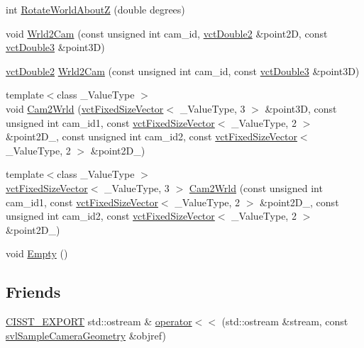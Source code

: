\begin{DoxyCompactItemize}
int \hyperlink{classsvl_sample_camera_geometry_a0d18a9b4f94e5326ba6fcee374e125dd}{Rotate\+World\+About\+Z} (double degrees)
\item 
void \hyperlink{classsvl_sample_camera_geometry_a536c770ee1d9bdc06b5d885d84782307}{Wrld2\+Cam} (const unsigned int cam\+\_\+id, \hyperlink{vct_fixed_size_vector_types_8h_afc0fdcc41cbe8b043747612501610812}{vct\+Double2} \&point2\+D, const \hyperlink{vct_fixed_size_vector_types_8h_a4a89122c9d7f72c3f31fe8126e17c3af}{vct\+Double3} \&point3\+D)
\item 
\hyperlink{vct_fixed_size_vector_types_8h_afc0fdcc41cbe8b043747612501610812}{vct\+Double2} \hyperlink{classsvl_sample_camera_geometry_a90b13ff843d12de76f791033cd51b0a0}{Wrld2\+Cam} (const unsigned int cam\+\_\+id, const \hyperlink{vct_fixed_size_vector_types_8h_a4a89122c9d7f72c3f31fe8126e17c3af}{vct\+Double3} \&point3\+D)
\item 
{\footnotesize template$<$class \+\_\+\+Value\+Type $>$ }\\void \hyperlink{classsvl_sample_camera_geometry_a70a7fddee2fe2e3867290ae428d5ff2f}{Cam2\+Wrld} (\hyperlink{classvct_fixed_size_vector}{vct\+Fixed\+Size\+Vector}$<$ \+\_\+\+Value\+Type, 3 $>$ \&point3\+D, const unsigned int cam\+\_\+id1, const \hyperlink{classvct_fixed_size_vector}{vct\+Fixed\+Size\+Vector}$<$ \+\_\+\+Value\+Type, 2 $>$ \&point2\+D\+\_, const unsigned int cam\+\_\+id2, const \hyperlink{classvct_fixed_size_vector}{vct\+Fixed\+Size\+Vector}$<$ \+\_\+\+Value\+Type, 2 $>$ \&point2\+D\+\_)
\item 
{\footnotesize template$<$class \+\_\+\+Value\+Type $>$ }\\\hyperlink{classvct_fixed_size_vector}{vct\+Fixed\+Size\+Vector}$<$ \+\_\+\+Value\+Type, 3 $>$ \hyperlink{classsvl_sample_camera_geometry_ad32f9b4fb70ddb49c5c8241d89c861cb}{Cam2\+Wrld} (const unsigned int cam\+\_\+id1, const \hyperlink{classvct_fixed_size_vector}{vct\+Fixed\+Size\+Vector}$<$ \+\_\+\+Value\+Type, 2 $>$ \&point2\+D\+\_, const unsigned int cam\+\_\+id2, const \hyperlink{classvct_fixed_size_vector}{vct\+Fixed\+Size\+Vector}$<$ \+\_\+\+Value\+Type, 2 $>$ \&point2\+D\+\_)
\item 
void \hyperlink{classsvl_sample_camera_geometry_a9877cc52943e73e80159dc4758a505a6}{Empty} ()
\end{DoxyCompactItemize}
\subsection*{Friends}
\begin{DoxyCompactItemize}
\item 
\hyperlink{cmn_export_macros_8h_a99393e0c3ac434b2605235bbe20684f8}{C\+I\+S\+S\+T\+\_\+\+E\+X\+P\+O\+R\+T} std\+::ostream \& \hyperlink{classsvl_sample_camera_geometry_ad223df811cb8caa99fcf544dc1c1a415}{operator$<$$<$} (std\+::ostream \&stream, const \hyperlink{classsvl_sample_camera_geometry}{svl\+Sample\+Camera\+Geometry} \&objref)
\end{DoxyCompactItemize}
